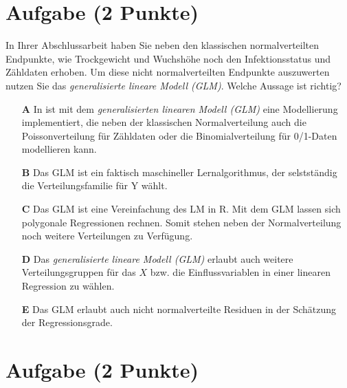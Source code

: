 \documentclass[a4paper, 9pt]{scrartcl}\usepackage[]{graphicx}\usepackage[]{xcolor}
\begin{document}
\section{Aufgabe \hfill (2 Punkte)}

\ifcollection
\begin{flushright}
\tiny\vspace{-2Ex}
\textbf{\examinhaltstart}
\exammodulebiostat
\vspace{-1Ex}
\end{flushright}
\fi




In Ihrer Abschlussarbeit haben Sie neben den klassischen normalverteilten Endpunkte, wie Trockgewicht und Wuchshöhe noch den Infektionsstatus und Zähldaten erhoben. Um diese nicht normalverteilten Endpunkte auszuwerten nutzen Sie das \textit{generalisierte lineare Modell (GLM)}. Welche Aussage ist richtig?




\begin{enumerate}
\item [\textbf{A} \msquare] In \Rlogo ist mit dem \textit{generalisierten linearen Modell (GLM)} eine Modellierung implementiert, die neben der klassischen Normalverteilung auch die Poissonverteilung für Zähldaten oder die Binomialverteilung für 0/1-Daten modellieren kann.
\item [\textbf{B} \msquare] Das GLM ist ein faktisch maschineller Lernalgorithmus, der selstständig die Verteilungsfamilie für Y wählt.
\item [\textbf{C} \msquare] Das GLM ist eine Vereinfachung des LM in R. Mit dem GLM lassen sich polygonale Regressionen rechnen. Somit stehen neben der Normalverteilung noch weitere Verteilungen zu Verfügung.
\item [\textbf{D} \msquare] Das \textit{generalisierte lineare Modell (GLM)} erlaubt auch weitere Verteilungsgruppen für das $X$ bzw. die Einflussvariablen in einer linearen Regression zu wählen.
\item [\textbf{E} \msquare] Das GLM erlaubt auch nicht normalverteilte Residuen in der Schätzung der Regressionsgrade.
\end{enumerate}

\section{Aufgabe \hfill (2 Punkte)}
\end{document}
